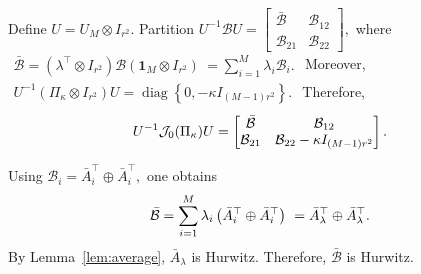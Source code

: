 \documentclass[conference]{IEEEtran}
\begin{document}
\begin{IEEEproof}
		Define
		$
		U
		=
		U_M\otimes I_{r^2}.
		$
		Partition
		$
		U^{-1}\mathscr BU
		=
		\begin{bmatrix}
			\bar{\mathcal B}
			&
			\mathcal B_{12}
			\\
			\mathcal B_{21}
			&
			\mathcal B_{22}
		\end{bmatrix},
		$
		where
		$
		\begin{aligned}
			\bar{\mathcal B}
			=
			(\lambda^\top\otimes I_{r^2})
			\mathscr B
			(\mathbf 1_M\otimes I_{r^2})\
			=
			\sum_{i=1}^{M}
			\lambda_i\mathcal B_i.
		\end{aligned}
		$
		Moreover,
		$
		\begin{aligned}
			U^{-1}
			\left(
			\Pi_\kappa\otimes I_{r^2}
			\right)
			U
			=
			\operatorname{diag}
			\left\{
			0,
			-\kappa I_{(M-1)r^2}
			\right\}.
		\end{aligned}
		$
		Therefore,
		\vspace{-0.2\baselineskip}
		\begin{equation}
			U^{-1}
			\mathcal J_0(\Pi_\kappa)
			U
			=
			\begin{bmatrix}
				\bar{\mathcal B}
				&
				\mathcal B_{12}
				\\
				\mathcal B_{21}
				&
				\mathcal B_{22}
				-
				\kappa I_{(M-1)r^2}
			\end{bmatrix}.			
			\label{eq:J0_transformed}
			\vspace{-0.2\baselineskip}
		\end{equation}
		
		Using
		$
		\mathcal B_i
		=
		\bar A_i^\top
		\oplus
		\bar A_i^\top,
		$
		one obtains
		\vspace{-0.2\baselineskip}
		\[
		\begin{aligned}
			\bar{\mathcal B}
			=
			\sum_{i=1}^{M}
			\lambda_i
			\left(
			\bar A_i^\top
			\oplus
			\bar A_i^\top
			\right)\
			=
			\bar A_\lambda^\top
			\oplus
			\bar A_\lambda^\top.
		\end{aligned}		
		\vspace{-0.2\baselineskip}
		\]
		By Lemma~\ref{lem:average},
		$\bar A_\lambda$ is Hurwitz. Therefore, $\bar{\mathcal B}$ is Hurwitz.
		

\end{IEEEproof}
\end{document}
